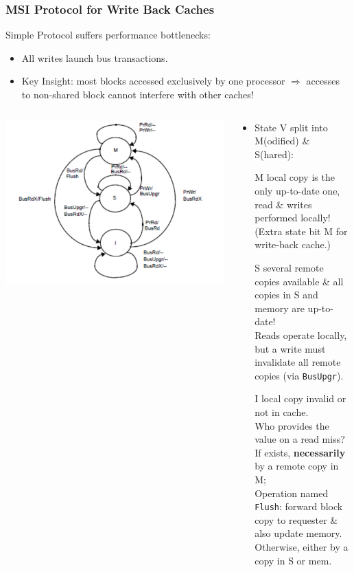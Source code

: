\documentclass{beamer}
\renewcommand{\emph}[1]{\textcolor{structure}{#1}}
\newcommand{\emp}[1]{\textcolor{DikuRed}{ #1}}
\begin{document}
\begin{frame}[fragile,t]
\frametitle{MSI Protocol for Write Back Caches}

Simple Protocol suffers performance bottlenecks:
\begin{itemize}
    \item \alert{All writes launch bus transactions.}\pause
    \item \emph{Key Insight}: most blocks accessed exclusively
            by one processor $\Rightarrow$ accesses to non-shared 
            block cannot interfere with other caches!
\end{itemize} 


\begin{columns}\hspace{-7ex}
\includegraphics[width=40ex]{Figures/FigsInfCoherence/MSI}\pause
{}
\begin{scriptsize}
\begin{itemize}
    \item State V split into M(odified) \& S(hared):\smallskip
    \item[M] local copy is the only up-to-date one,\\
            read \& writes performed locally!\\
            (Extra state bit M for write-back cache.)\smallskip
    \item[S] several remote copies available \& all copies in S and memory are up-to-date!\\
             Reads operate locally, but a write must invalidate 
            all remote copies (via {\tt BusUpgr}).\smallskip
    \item[I] local copy invalid or not in cache.\\
                \emp{Who provides the value on a read miss?}\\
                    \emp{If exists}, {\bf necessarily} by a remote copy in M;\\ 
                    Operation named {\tt Flush}: forward block\\ 
                    copy to requester \& also update memory.\\
                    \emp{Otherwise}, either by a copy in S or mem.
\end{itemize}
\end{scriptsize}
\end{columns}

\end{frame}
\end{document}
